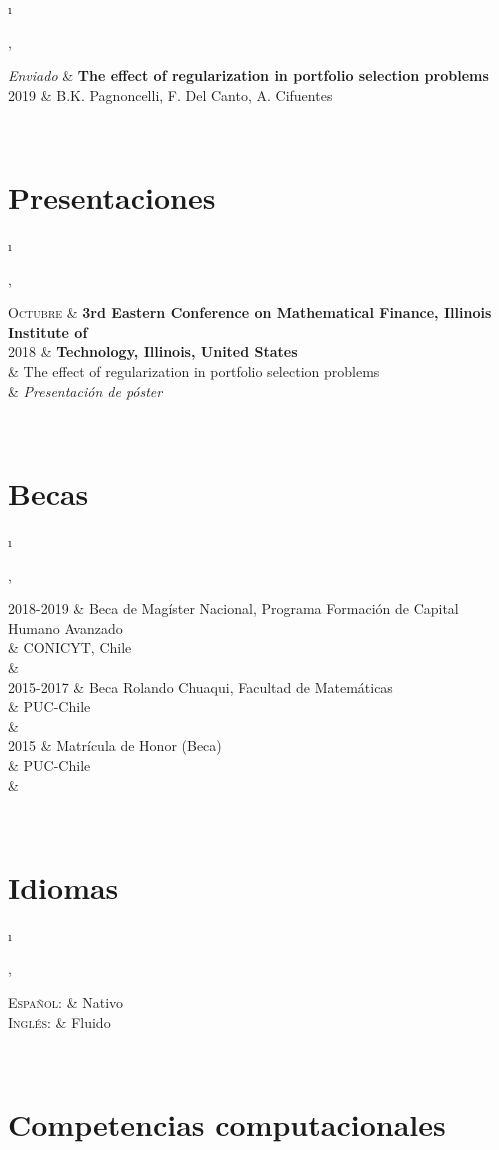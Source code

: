 \documentclass[a4paper,10pt]{article}
\newcommand{\tablength}{}
\newcommand{\setTabParams}[1]{\renewcommand\tablength{}\forcsvlist{\listadd\tablength}{#1}}
\newcommand{\setCols}[1]{			%
	\ifnum0=\i						%
		\ifdim0cm=#1				%
			\def \firstCol {r}		%
		\else						%
			\def \firstCol {p{#1}}		%
		\fi						%
	\else \ifnum1=\i				%
		\ifdim0cm=#1				%
			\def \secondCol {l}		%
		\else						%
			\def \secondCol{p{#1}}	%
		\fi						%
	\else \ifnum2=\i				%
		\ifnum0=#1				%
			\def \sep {}			%
		\else						%
			\def \sep {|}			%
		\fi						%
	\fi \fi \fi						%
	\advance\i by1					%
}
\newcommand{\tab}[1]{					%
	\newcount\i						%
	\forlistloop{\setCols}{\tablength}		%
	\begin{tabular}{\firstCol \sep \secondCol}	%
		#1							%
	\end{tabular} \\						%
}
\begin{document}
\tab{
\emph{Enviado}
 	&	\textbf{The effect of regularization in portfolio selection problems} \\
\textsc{2019}
	&	\footnotesize{B.K. Pagnoncelli, F. Del Canto, A. Cifuentes}	\\
}
	
\section{Presentaciones}
\setTabParams{0cm,11cm,1}

\tab{
\textsc{Octubre}
 	&	\textbf{3rd Eastern Conference on Mathematical Finance, Illinois Institute of}	\\
\textsc{2018}
	&	\textbf{Technology, Illinois, United States} \\
	&	The effect of regularization in portfolio selection problems	\\
	&	\emph{Presentación de póster}
}

\section{Becas}
\setTabParams{0cm,0cm,0}

\tab{
\textsc{2018-2019} 
	&	Beca de Magíster Nacional, Programa Formación de Capital Humano Avanzado	\\
	&	CONICYT, Chile	\\
	&	\\

\textsc{2015-2017} 
	&	Beca Rolando Chuaqui, Facultad de Matemáticas	\\
	&	PUC-Chile	\\
	&	\\

\textsc{2015}
	&	Matrícula de Honor (Beca)	\\
	&	PUC-Chile	\\
	&	\\
}

\section{Idiomas}
\setTabParams{0cm,0cm,0}

\tab{
 \textsc{Español:}
 	&	Nativo	\\
\textsc{Inglés:}
	&	Fluido	\\
}


\section{Competencias computacionales}
\setTabParams{0cm,0cm,0}
\end{document}
